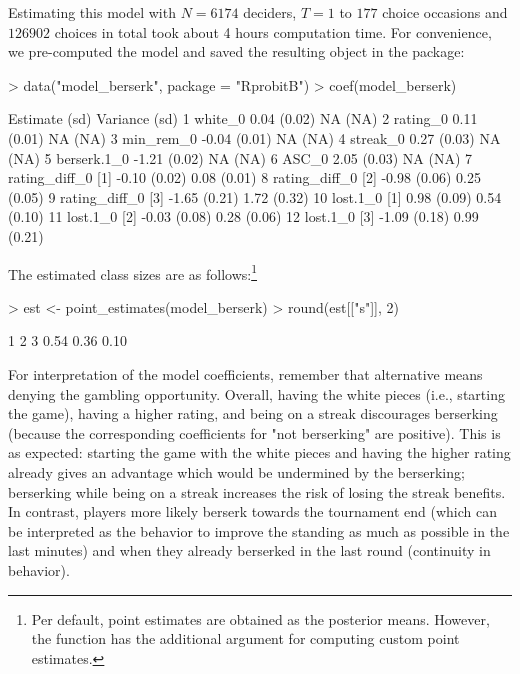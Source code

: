 \documentclass[article,shortnames]{jss}
\newcommand{\fct}[1]{\code{#1()}}
\begin{document}
Estimating this model with $N = 6174$ deciders, $T = 1$ to $177$ choice occasions and $126902$ choices in total took about 4 hours computation time. For convenience, we pre-computed the model and saved the resulting  object in the package:

\begin{Schunk}
\begin{Sinput}
> data("model_berserk", package = "RprobitB")
> coef(model_berserk)
\end{Sinput}
\begin{Soutput}
                     Estimate   (sd) Variance   (sd)
1           white_0      0.04 (0.02)       NA   (NA)
2          rating_0      0.11 (0.01)       NA   (NA)
3         min_rem_0     -0.04 (0.01)       NA   (NA)
4          streak_0      0.27 (0.03)       NA   (NA)
5       berserk.1_0     -1.21 (0.02)       NA   (NA)
6             ASC_0      2.05 (0.03)       NA   (NA)
7  rating_diff_0 [1]    -0.10 (0.02)     0.08 (0.01)
8  rating_diff_0 [2]    -0.98 (0.06)     0.25 (0.05)
9  rating_diff_0 [3]    -1.65 (0.21)     1.72 (0.32)
10      lost.1_0 [1]     0.98 (0.09)     0.54 (0.10)
11      lost.1_0 [2]    -0.03 (0.08)     0.28 (0.06)
12      lost.1_0 [3]    -1.09 (0.18)     0.99 (0.21)
\end{Soutput}
\end{Schunk}

The estimated class sizes are as follows:\footnote{Per default, point estimates are obtained as the posterior means. However, the \fct{point\_estimates} function has the additional  argument for computing custom point estimates.}

\begin{Schunk}
\begin{Sinput}
> est <- point_estimates(model_berserk)
> round(est[["s"]], 2)
\end{Sinput}
\begin{Soutput}
   1    2    3
0.54 0.36 0.10
\end{Soutput}
\end{Schunk}

For interpretation of the model coefficients, remember that alternative  means denying the gambling opportunity. Overall, having the white pieces (i.e., starting the game), having a higher rating, and being on a streak discourages berserking (because the corresponding coefficients for "not berserking" are positive). This is as expected: starting the game with the white pieces and having the higher rating already gives an advantage which would be undermined by the berserking; berserking while being on a streak increases the risk of losing the streak benefits. In contrast, players more likely berserk towards the tournament end (which can be interpreted as the behavior to improve the standing as much as possible in the last minutes) and when they already berserked in the last round (continuity in behavior).
\end{document}
